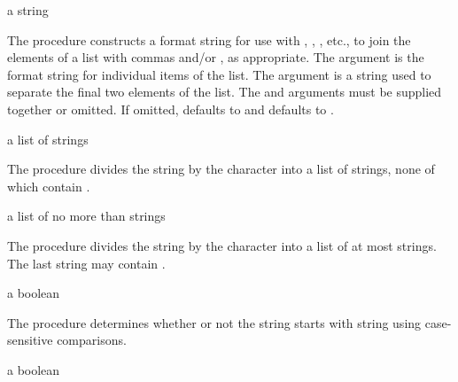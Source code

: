 \begin{procedure}
\end{procedure}
\returns{} a string

The  procedure constructs a format string for use with
, , , etc., to join the elements
of a list with commas and/or , as appropriate.
The  argument is the format string for individual
items of the list.
The  argument is a string used to separate the final two elements
of the list.
The  and  arguments must be supplied together or
omitted.
If omitted,  defaults to  and 
defaults to .

\begin{procedure}
\end{procedure}
\returns{} a list of strings

The  procedure divides the  string by the
 character into a list of strings, none of which
contain .

\begin{procedure}
\end{procedure}
\returns{} a list of no more than  strings

The  procedure divides the  string by the
 character into a list of at most  strings. The
last string may contain .

\begin{procedure}
\end{procedure}
\returns{} a boolean

The  procedure determines whether or not the string
 starts with string  using case-sensitive comparisons.

\begin{procedure}
\end{procedure}
\returns{} a boolean

